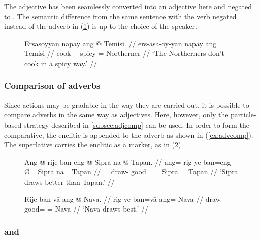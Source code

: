 The adjective  has been seamlessly converted into an
adjective here and negated to . The semantic
difference from the same sentence with the verb negated instead of the adverb
in (\ref{ex:advneg_2}) is up to the choice of the speaker.

\begin{figure}[h]
\ex\label{ex:advneg_2}\begingl
	\gla Ersasoyyan napay ang @ Temisi. //
	\glb ers-asa-oy-yan napay ang= Temisi //
	\glc cook-\Hab{}-\Neg{}-\TplM{} spicy \Aarg{}= Northerner //
	\glft `The Northerners don't cook in a spicy way.' //
\endgl\xe
\end{figure}

\subsubsection{Comparison of adverbs}

Since actions may be gradable in the way they are carried out, it is 
possible to compare adverbs in the same way as adjectives. Here, however, only 
the particle-based strategy described in \autoref{subsec:adjcomp} 
can be used. In order to form the comparative, the enclitic 
 is appended to the adverb as shown in (\ref{ex:advcomp}). The
superlative carries the enclitic  as a marker, as in
(\ref{ex:advsupl}).

\begin{figure}[h]
\pex
\a\label{ex:advcomp}\begingl
	\gla Ang @ rije ban-eng {} @ Sipra na @ Tapan. //
	\glb ang= rig-ye ban=eng Ø= Sipra na= Tapan //
	\glc \AgtT{}= draw-\TsgF{} good=\Comp{} \Top{}= Sipra \Gen{}= Tapan //
	\glft `Sipra draws better than Tapan.' //
\endgl

\a\label{ex:advsupl}\begingl
	\gla Rije ban-vā ang @ Nava. //
	\glb rig-ye ban=vā ang= Nava //
	\glc draw-\TsgF{} good=\Supl{} \Aarg{}= Nava //
	\glft `Nava draws best.' //
\endgl
\xe
\end{figure}


\subsubsection{ and }
\label{subsubsec:maayvoy}

